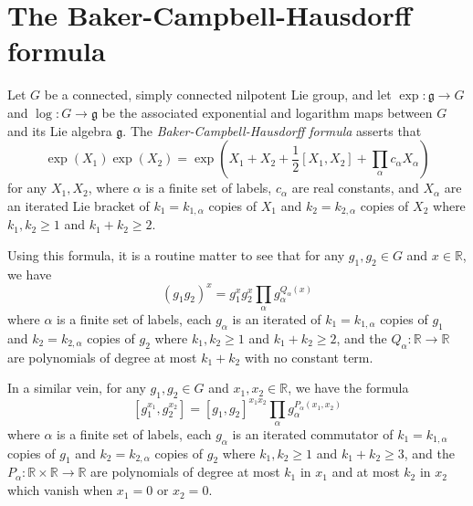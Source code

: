 \documentclass[11pt,reqno]{amsart}
\numberwithin{equation}{section}
\theoremstyle{plain}
\theoremstyle{definition}
\renewcommand{\geq}{\geqslant}
\newcommand\R{\mathbb{R}}
\newcommand\1{{\bf 1}}
\newcommand\2{{\bf 2}}
\begin{document}
\section{The Baker-Campbell-Hausdorff formula}\label{bch}

Let $G$ be a connected, simply connected nilpotent Lie group, and let $\exp: {\mathfrak g} \to G$ and $\log: G \to {\mathfrak g}$ be the associated exponential and logarithm maps between $G$ and its Lie algebra ${\mathfrak g}$.   
The \emph{Baker-Campbell-Hausdorff formula} asserts that
$$
\exp( X_1 ) \exp( X_2 ) = \exp( X_1 + X_2 + \frac{1}{2} [X_1,X_2] + \prod_\alpha c_\alpha X_\alpha )$$
for any $X_1,X_2$, where $\alpha$ is a finite set of labels, $c_\alpha$ are real constants, and $X_\alpha$ are an iterated Lie bracket of $k_1 = k_{1,\alpha}$ copies of $X_1$ and $k_2 = k_{2,\alpha}$ copies of $X_2$ where $k_1,k_2 \geq 1$ and $k_1+k_2 \geq 2$.

Using this formula, it is a routine matter to see that for any $g_1,g_2 \in G$ and $x \in \R$, we have 
\begin{equation}\label{bch-2}
(g_1 g_2)^x = g_1^x g_2^x \prod_\alpha g_\alpha^{Q_\alpha(x)}
\end{equation}
where $\alpha$ is a finite set of labels, each $g_\alpha$ is an iterated of $k_1 = k_{1,\alpha}$ copies of $g_1$ and $k_2 = k_{2,\alpha}$ copies of $g_2$ where $k_1,k_2 \geq 1$ and $k_1+k_2 \geq 2$, and the $Q_\alpha: \R \to \R$ are polynomials of degree at most $k_1+k_2$ with no constant term.

In a similar vein, for any $g_1, g_2 \in G$ and $x_1,x_2 \in \R$, we have the formula
\begin{equation}\label{comm-form}
[g_1^{x_1}, g_2^{x_2}] = [g_1,g_2]^{x_1 x_2} \prod_\alpha g_\alpha^{P_\alpha(x_1,x_2)}
\end{equation}
where $\alpha$ is a finite set of labels, each $g_\alpha$ is an iterated commutator of $k_1 = k_{1,\alpha}$ copies of $g_1$ and $k_2 = k_{2,\alpha}$ copies of $g_2$ where $k_1,k_2 \geq 1$ and $k_1+k_2 \geq 3$, and the $P_\alpha: \R \times \R \to \R$ are polynomials of degree at most $k_1$ in $x_1$ and at most $k_2$ in $x_2$ which vanish when $x_1=0$ or $x_2=0$.
\end{document}
